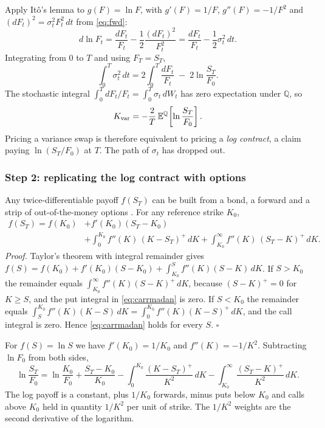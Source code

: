 Apply It\^o's lemma to $g(F)=\ln F$, with $g'(F)=1/F$, $g''(F)=-1/F^2$ and $(dF_t)^2=\sigma_t^2F_t^2\,dt$ from \eqref{eq:fwd}:
\begin{equation}
  d\ln F_t = \frac{dF_t}{F_t} - \frac{1}{2}\frac{(dF_t)^2}{F_t^2}
           = \frac{dF_t}{F_t} - \frac{1}{2}\sigma_t^2\,dt .
\end{equation}
Integrating from $0$ to $T$ and using $F_T=S_T$,
\begin{equation}
  \int_0^T \sigma_t^2\,dt = 2\int_0^T \frac{dF_t}{F_t} \;-\; 2\ln\frac{S_T}{F_0}.
  \label{eq:decomp}
\end{equation}
The stochastic integral $\int_0^T dF_t/F_t=\int_0^T\sigma_t\,dW_t$ has zero expectation under $\mathbb{Q}$, so
\begin{equation}
  K_{\mathrm{var}} = -\frac{2}{T}\,\mathbb{E}^{\mathbb{Q}}\!\left[\ln\frac{S_T}{F_0}\right].
  \label{eq:logcontract}
\end{equation}
Pricing a variance swap is therefore equivalent to pricing a \emph{log contract}, a claim paying $\ln(S_T/F_0)$ at $T$. The path of $\sigma_t$ has dropped out.

\subsubsection{Step 2: replicating the log contract with options}

Any twice-differentiable payoff $f(S_T)$ can be built from a bond, a forward and a strip of out-of-the-money options \cite{carrmadan}. For any reference strike $K_0$,
\begin{equation}
\begin{split}
  f(S_T) = f(K_0) &+ f'(K_0)(S_T-K_0)\\
  &+ \int_0^{K_0} f''(K)\,(K-S_T)^+\,dK
  + \int_{K_0}^{\infty} f''(K)\,(S_T-K)^+\,dK .
\end{split}
  \label{eq:carrmadan}
\end{equation}
\textit{Proof.} Taylor's theorem with integral remainder gives
$f(S) = f(K_0) + f'(K_0)(S-K_0) + \int_{K_0}^{S} f''(K)(S-K)\,dK$.
If $S>K_0$ the remainder equals $\int_{K_0}^{\infty} f''(K)(S-K)^+\,dK$, because $(S-K)^+=0$ for $K\ge S$, and the put integral in \eqref{eq:carrmadan} is zero. If $S<K_0$ the remainder equals $\int_{S}^{K_0} f''(K)(K-S)\,dK=\int_0^{K_0} f''(K)(K-S)^+\,dK$, and the call integral is zero. Hence \eqref{eq:carrmadan} holds for every $S$. \hfill$\square$

For $f(S)=\ln S$ we have $f'(K_0)=1/K_0$ and $f''(K)=-1/K^2$. Subtracting $\ln F_0$ from both sides,
\begin{equation}
  \ln\frac{S_T}{F_0} = \ln\frac{K_0}{F_0} + \frac{S_T-K_0}{K_0}
  - \int_0^{K_0}\frac{(K-S_T)^+}{K^2}\,dK
  - \int_{K_0}^{\infty}\frac{(S_T-K)^+}{K^2}\,dK .
  \label{eq:logrep}
\end{equation}
The log payoff is a constant, plus $1/K_0$ forwards, minus puts below $K_0$ and calls above $K_0$ held in quantity $1/K^2$ per unit of strike. The $1/K^2$ weights are the second derivative of the logarithm.

